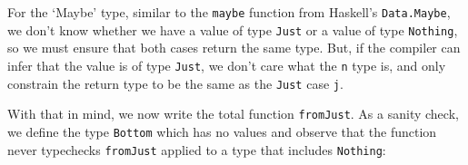 \documentclass[]{article}
\newenvironment{Shaded}{}{}
\newcommand{\KeywordTok}[1]{\textcolor[rgb]{0.00,0.44,0.13}{\textbf{{#1}}}}
\newcommand{\DataTypeTok}[1]{\textcolor[rgb]{0.56,0.13,0.00}{{#1}}}
\newcommand{\StringTok}[1]{\textcolor[rgb]{0.25,0.44,0.63}{{#1}}}
\newcommand{\OtherTok}[1]{\textcolor[rgb]{0.00,0.44,0.13}{{#1}}}
\newcommand{\FunctionTok}[1]{\textcolor[rgb]{0.02,0.16,0.49}{{#1}}}
\newcommand{\NormalTok}[1]{{#1}}
\begin{document}
\begin{Shaded}
\end{Shaded}

For the `Maybe' type, similar to the \texttt{maybe} function from
Haskell's \texttt{Data.Maybe}, we don't know whether we have a value of
type \texttt{Just} or a value of type \texttt{Nothing}, so we must
ensure that both cases return the same type. But, if the compiler can
infer that the value is of type \texttt{Just}, we don't care what the
\texttt{n} type is, and only constrain the return type to be the same as
the \texttt{Just} case \texttt{j}.

With that in mind, we now write the total function \texttt{fromJust}. As
a sanity check, we define the type \texttt{Bottom} which has no values
and observe that the function never typechecks \texttt{fromJust} applied
to a type that includes \texttt{Nothing}:

\begin{Shaded}
\end{Shaded}
\end{document}
